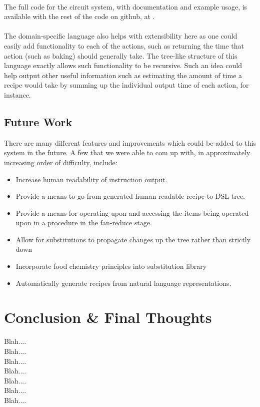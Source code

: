 \paragraph{}
The full code for the circuit system, with documentation and example usage, is available with the rest of the code on github, at .

\paragraph{}
The domain-specific language also helps with extensibility here as one could easily add functionality to each of the actions, such as returning the time that action (such as baking) should generally take. The tree-like structure of this language exactly allows such functionality to be recursive. Such an idea could help output other useful information such as estimating the amount of time a recipe would take by summing up the individual output time of each action, for instance.

\subsection{Future Work}
There are many different features and improvements which could be added to this system in the future. A few that we were able to com up with, in approximately increasing order of difficulty, include:
\begin{itemize}
\item Increase human readability of instruction output.
\item Provide a means to go from generated human readable recipe to DSL tree.
\item Provide a means for operating upon and accessing the items being operated upon in a procedure in the fan-reduce stage.
\item Allow for substitutions to propagate changes up the tree rather than strictly down
\item Incorporate food chemistry principles into substitution library
\item Automatically generate recipes from natural language representations.
\end{itemize}


















\newpage
\section{Conclusion \& Final Thoughts}
Blah....\\
Blah....\\
Blah....\\
Blah....\\
Blah....\\
Blah....\\
Blah....\\


